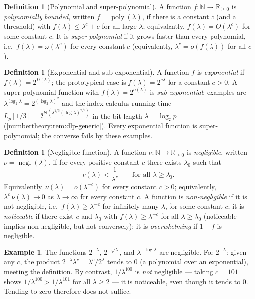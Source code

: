 \documentclass[11pt,a4paper]{article}
\theoremstyle{definition}
\newtheorem{definition}[theorem]{Definition}
\newtheorem{example}[theorem]{Example}
\theoremstyle{remark}
\newcommand{\N}{\ensuremath{\mathbb{N}}}
\newcommand{\R}{\ensuremath{\mathbb{R}}}
\DeclareMathOperator{\negl}{negl}
\DeclareMathOperator{\poly}{poly}
\begin{document}
\begin{definition}[Polynomial and super-polynomial]
\label{probability:def-poly}
A function \(f\colon \N \to \R_{\ge 0}\) is \emph{polynomially
bounded}, written \(f = \poly(\lambda)\), if there is a constant \(c\)
(and a threshold) with \(f(\lambda) \le \lambda^c + c\) for all large
\(\lambda\); equivalently, \(f(\lambda) = O(\lambda^c)\) for some
constant \(c\). It is \emph{super-polynomial} if it grows faster than
every polynomial, i.e.\ \(f(\lambda) = \omega(\lambda^c)\) for every
constant \(c\) (equivalently, \(\lambda^c = o(f(\lambda))\) for all
\(c\)).
\end{definition}

\begin{definition}[Exponential and sub-exponential]
\label{probability:def-exp-fn}
A function \(f\) is \emph{exponential} if
\(f(\lambda) = 2^{\Omega(\lambda)}\); the prototypical case is
\(f(\lambda) = 2^{c\lambda}\) for a constant \(c > 0\). A
super-polynomial function with \(f(\lambda) = 2^{o(\lambda)}\) is
\emph{sub-exponential}; examples are
\(\lambda^{\log_2 \lambda} = 2^{(\log_2 \lambda)^2}\) and the
index-calculus running time
\(L_p[1/3] = 2^{\Theta(\lambda^{1/3} (\log \lambda)^{2/3})}\) in the
bit length \(\lambda = \log_2 p\)
(\cref{numbertheory:rem:dlp-generic}). Every exponential function is
super-polynomial; the converse fails by these examples.
\end{definition}

\begin{definition}[Negligible function]\label{probability:def-negl}
A function \(\nu\colon \N \to \R_{\ge 0}\) is \emph{negligible},
written \(\nu = \negl(\lambda)\), if for every positive constant \(c\)
there exists \(\lambda_0\) such that
\[
\nu(\lambda) < \frac{1}{\lambda^{c}}
\qquad \text{for all } \lambda \ge \lambda_0 .
\]
Equivalently, \(\nu(\lambda) = o(\lambda^{-c})\) for every constant
\(c > 0\); equivalently, \(\lambda^{c}\,\nu(\lambda) \to 0\) as
\(\lambda \to \infty\) for every constant \(c\). A function is
\emph{non-negligible} if it is not negligible, i.e.\
\(f(\lambda) \ge \lambda^{-c}\) for infinitely many \(\lambda\), for
some constant \(c\); it is \emph{noticeable} if there exist \(c\) and
\(\lambda_0\) with \(f(\lambda) \ge \lambda^{-c}\) for all
\(\lambda \ge \lambda_0\) (noticeable implies non-negligible, but not
conversely); it is \emph{overwhelming} if \(1 - f\) is negligible.
\end{definition}

\begin{example}\label{probability:exp-negl}
The functions \(2^{-\lambda}\), \(2^{-\sqrt{\lambda}}\), and
\(\lambda^{-\log\lambda}\) are negligible. For \(2^{-\lambda}\):
given any \(c\), the product
\(2^{-\lambda}\lambda^{c} = \lambda^c / 2^{\lambda}\) tends to \(0\)
(a polynomial over an exponential), meeting the definition. By
contrast, \(1/\lambda^{100}\) is \emph{not} negligible --- taking
\(c = 101\) shows \(1/\lambda^{100} > 1/\lambda^{101}\) for all
\(\lambda \ge 2\) --- it is noticeable, even though it tends to
\(0\). Tending to zero therefore does not suffice.
\end{example}
\end{document}
